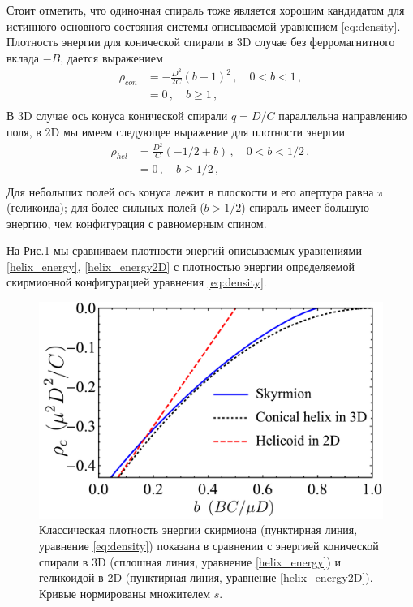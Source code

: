 \documentclass[a4paper,article,14pt]{extarticle}
\begin{document}
Стоит отметить, что одиночная спираль тоже является хорошим кандидатом для истинного основного состояния системы описываемой уравнением \eqref{eq:density}. Плотность энергии для конической спирали в 3D случае без ферромагнитного вклада $-B$, дается выражением \cite{Maleyev2006}
 \begin{equation}
\begin{aligned}
\rho_{con} & = - \frac{D^{2}}{2C} (b-1)^{2} \,, \quad  0<b<1   \,, \\
 &= 0   \,, \quad  b \ge1 \,,  \\
\end{aligned}
\label{helix_energy}
\end{equation}
В 3D случае ось конуса конической спирали $q=D/C$ параллельна направлению поля, в 2D мы имеем следующее выражение для плотности энергии
 \begin{equation}
\begin{aligned}
\rho_{hel} & = \frac{D^{2}}{C} (-1/2+b) \,, \quad  0<b<1/2   \,, \\
 &= 0   \,, \quad  b \ge1/2 \,,  \\
\end{aligned}
\label{helix_energy2D}
\end{equation}
Для небольших полей ось конуса лежит в плоскости и его апертура равна $ \pi $ (геликоида); для более сильных полей ($ b > 1/2 $) спираль имеет большую энергию, чем конфигурация с равномерным спином.

На Рис.\ref{fig:Sk_v_helix} мы сравниваем плотности энергий описываемых уравнениями \eqref{helix_energy}, \eqref{helix_energy2D} с плотностью энергии определяемой скирмионной конфигурацией уравнения \eqref{eq:density}.


\begin{figure}[t]
\centering	
\includegraphics[width=0.85\columnwidth]{images/Sk_v_helix.pdf}
\caption{Классическая плотность энергии скирмиона (пунктирная линия, уравнение \eqref{eq:density}) показана в сравнении с энергией конической спирали в 3D (сплошная линия, уравнение \eqref{helix_energy}) и геликоидой в 2D (пунктирная линия, уравнение \eqref{helix_energy2D}). Кривые нормированы множителем $s$.}
\label{fig:Sk_v_helix}
\end{figure}
\end{document}
